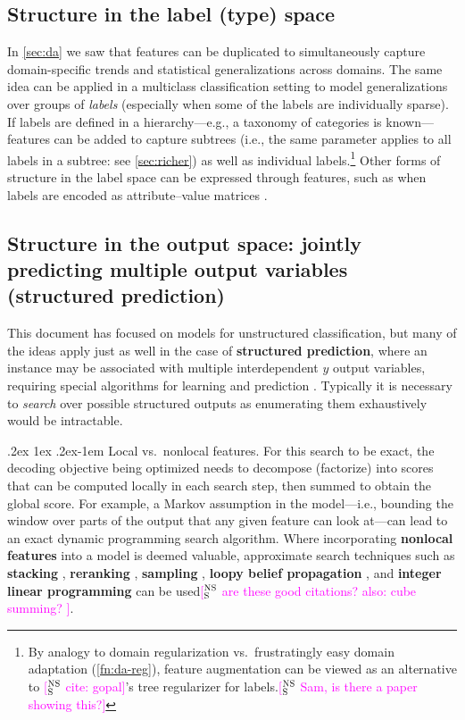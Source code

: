 \documentclass[11pt,letterpaper]{article}
\makeatletter
\newcommand{\ensuretext}[1]{#1}
\newcommand{\nssmarker}{\ensuretext{\textcolor{magenta}{\ensuremath{^{\textsc{NS}}_{\textsc{S}}}}}}
\newcommand{\arkcomment}[3]{\ensuretext{\textcolor{#3}{[#1 #2]}}}
\newcommand{\nss}[1]{\arkcomment{\nssmarker}{#1}{magenta}}
\newcommand{\fnref}[1]{\autoref{#1}} %
\renewcommand{\paragraph}{%
  \@startsection{paragraph}{4}%
  {\z@}{.2ex \@plus 1ex \@minus .2ex}{-1em}%
  {\normalfont\normalsize\bfseries}%
}
\makeatother
\begin{document}
\subsection{Structure in the label (type) space}\label{sec:lblstruct}

In \cref{sec:da} we saw that features can be duplicated to simultaneously capture 
domain-specific trends and statistical generalizations across domains. 
The same idea can be applied in a multiclass classification setting 
to model generalizations over groups of \emph{labels} (especially when some of the labels are individually sparse). 
If labels are defined in a hierarchy---e.g., a taxonomy of categories is known---features 
can be added to capture subtrees (i.e., the same parameter applies to all labels in 
a subtree: see \cref{sec:richer}) as well as individual labels.\footnote{By analogy to domain regularization vs.~frustratingly easy domain adaptation
(\fnref{fn:da-reg}), feature augmentation can be viewed as an alternative to \nss{cite: gopal}'s tree regularizer for labels.\nss{Sam, is there a paper showing this?}}
Other forms of structure in the label space can be expressed through features, 
such as when labels are encoded as attribute--value matrices \citep{bhatia-14}.

\subsection{Structure in the output space: jointly predicting multiple output variables (structured prediction)}

This document has focused on models for unstructured classification, 
but many of the ideas apply just as well in the case of \textbf{structured prediction}, 
where an instance may be associated with multiple interdependent $y$ output variables, 
requiring special algorithms for learning and prediction \citep{smith}.
Typically it is necessary to \emph{search} over possible structured outputs 
as enumerating them exhaustively would be intractable. 

\paragraph{Local vs.~nonlocal features.} 
For this search to be exact, the decoding objective being optimized 
needs to decompose (factorize) into scores that can be computed locally 
in each search step, then summed to obtain the global score. 
For example, a Markov assumption in the model---i.e., 
bounding the window over parts of the output that any given feature can look at---can 
lead to an exact dynamic programming search algorithm.
Where incorporating \textbf{nonlocal features} into a model is deemed valuable, 
approximate search techniques such as \textbf{stacking} \citep{cohen-05,krishnan-06,martins-08}, 
\textbf{reranking} \citep{collins-05,koo-05,toutanova-05,huang-08}, \textbf{sampling} \citep{finkel-05}, 
\textbf{loopy belief propagation} \citep{sutton-04,smith-08},
and \textbf{integer linear programming} \citep{roth-05,martins-09} can be used\nss{are these good citations? also: cube summing? \citep{gimpel-09}}.
\end{document}
